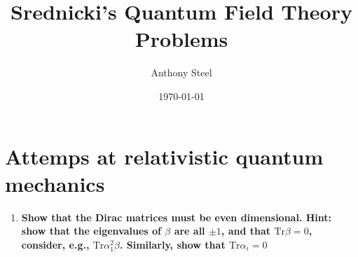 \documentclass[9pt]{report}
\begin{document}
\title{Srednicki's Quantum Field Theory\protect\\ Problems}
\author{Anthony Steel}
\date{\today}
\maketitle
\chapter{Attemps at relativistic quantum mechanics}
\begin{enumerate}
  \item
  \textbf{Show that the Dirac matrices must be even dimensional. Hint: show that
  the eigenvalues of $\beta$ are all $\pm1$, and that $\text{Tr}\beta = 0$, consider,
e.g., $\text{Tr}\alpha^2_1\beta$. Similarly, show that $\text{Tr}\alpha_i=0$}
  

\end{enumerate}
\end{document}

